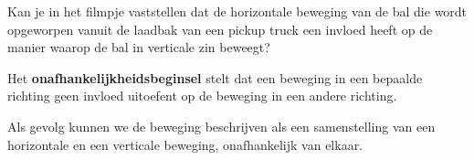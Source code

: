 \documentclass{ximera}
\begin{document}
	\author{Bart Lambregs}
    \xmsource\xmuitleg

\begin{denkvraag*}{}
	Kan je in het filmpje vaststellen dat de horizontale beweging van de bal die wordt opgeworpen vanuit de laadbak van een pickup truck een invloed heeft op de manier waarop de bal in verticale zin beweegt?
	\begin{center}
	\end{center}
\end{denkvraag*}

\begin{definition}{}
	Het \textbf{onafhankelijkheidsbeginsel} stelt dat een beweging in een bepaalde richting geen invloed uitoefent op de beweging in een andere richting. 
\end{definition}

Als gevolg kunnen we de beweging beschrijven als een samenstelling van een horizontale en een verticale beweging, onafhankelijk van elkaar.
\end{document}
